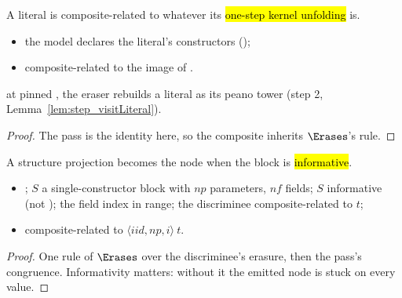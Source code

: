 \begin{lemma}[Literals]
\label{lem:ErasesLB-lit}
\leanok
{}
 A literal is composite-related to whatever its \hl{one-step kernel unfolding} is.
\begin{itemize}
\item {} the model declares the literal's constructors ();
\item {} composite-related to the image of .
\end{itemize}
 at pinned , the eraser rebuilds a  literal as its peano tower
(step 2, Lemma~\ref{lem:step_visitLiteral}).
\end{lemma}
\begin{proof}
\leanok
{}
 The pass is the identity here, so the composite inherits $\Erases$'s  rule.
\end{proof}

\begin{lemma}[Projections]
\label{lem:ErasesLB-proj}
\leanok
{}
 A structure projection becomes the \lbox{}  node when the block is
\hl{informative}.
\begin{itemize}
\item {} ; $S$ a single-constructor block with $np$ parameters, $nf$ fields;
$S$ informative (not ); the field index in range; the discriminee composite-related to $t$;
\item {} composite-related to  $\langle iid, np, i\rangle\ t$.
\end{itemize}
\end{lemma}
\begin{proof}
\leanok
{}
 One  rule of $\Erases$ over the discriminee's erasure, then the pass's 
congruence. Informativity matters: without it the emitted node is stuck on every value.
\end{proof}

